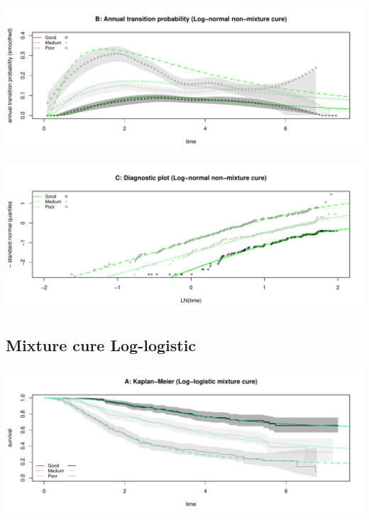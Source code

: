 \documentclass[
]{article}
\begin{document}
\begin{flushleft}\includegraphics[height=0.25\textheight]{Images/cure_lnorm_nmix-2} \end{flushleft}

\begin{flushleft}\includegraphics[height=0.25\textheight]{Images/cure_lnorm_nmix-3} \end{flushleft}

\clearpage

\hypertarget{mixture-cure-log-logistic}{%
\subsection{Mixture cure Log-logistic}\label{mixture-cure-log-logistic}}

\begin{flushleft}\includegraphics[height=0.25\textheight]{Images/cure_llog_mix-1} \end{flushleft}
\end{document}
